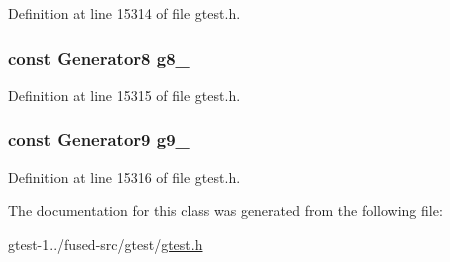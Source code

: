 \-Definition at line 15314 of file gtest.\-h.

\hypertarget{classtesting_1_1internal_1_1CartesianProductHolder9_a33efc612232313b29b814adcffee62e6}{
\subsubsection[{g8\-\_\-}]{\setlength{\rightskip}{0pt plus 5cm}const \-Generator8 {\bf g8\-\_\-}}}\label{de/dd1/classtesting_1_1internal_1_1CartesianProductHolder9_a33efc612232313b29b814adcffee62e6}


\-Definition at line 15315 of file gtest.\-h.

\hypertarget{classtesting_1_1internal_1_1CartesianProductHolder9_ab18e76dd6bb0c7782e0fc18c04b82063}{
\subsubsection[{g9\-\_\-}]{\setlength{\rightskip}{0pt plus 5cm}const \-Generator9 {\bf g9\-\_\-}}}\label{de/dd1/classtesting_1_1internal_1_1CartesianProductHolder9_ab18e76dd6bb0c7782e0fc18c04b82063}


\-Definition at line 15316 of file gtest.\-h.



\-The documentation for this class was generated from the following file\-:\begin{DoxyCompactItemize}
\item 
gtest-\/1../fused-\/src/gtest/\hyperlink{fused-src_2gtest_2gtest_8h}{gtest.\-h}\end{DoxyCompactItemize}
